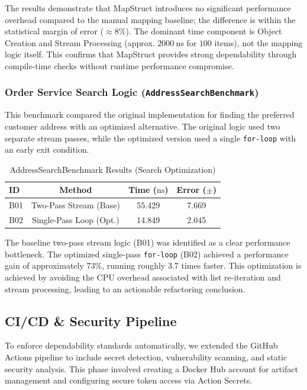 The results demonstrate that MapStruct introduces no significant performance overhead compared to the manual mapping baseline; the difference is within the statistical margin of error ($\approx 8\%$). The dominant time component is Object Creation and Stream Processing (approx. $2000~\text{ns}$ for $100$ items), not the mapping logic itself. This confirms that MapStruct provides strong dependability through compile-time checks without runtime performance compromise.

\subsubsection{Order Service Search Logic (\texttt{AddressSearchBenchmark})}
This benchmark compared the original implementation for finding the preferred customer address with an optimized alternative. The original logic used two separate stream passes, while the optimized version used a single \texttt{for-loop} with an early exit condition.

\begin{table}[h]
    \centering
    \begin{tabular}{l c c c}
        \toprule
        \textbf{ID} & \textbf{Method} & \textbf{Time ($\text{ns}$)} & \textbf{Error ($\pm$)} \\
        \midrule
        B01 & Two-Pass Stream (Base) & 55.429 & 7.669 \\
        B02 & Single-Pass Loop (Opt.) & 14.849 & 2.045 \\
        \bottomrule
    \end{tabular}
    \caption{AddressSearchBenchmark Results (Search Optimization)}
    \label{tab:search_benchmark}
\end{table}

The baseline two-pass stream logic (B01) was identified as a clear performance bottleneck. The optimized single-pass \texttt{for-loop} (B02) achieved a performance gain of approximately $73\%$, running roughly $3.7$ times faster. This optimization is achieved by avoiding the CPU overhead associated with list re-iteration and stream processing, leading to an actionable refactoring conclusion.

\subsection{CI/CD \& Security Pipeline}
To enforce dependability standards automatically, we extended the GitHub Actions pipeline to include secret detection, vulnerability scanning, and static security analysis. This phase involved creating a Docker Hub account for artifact management and configuring secure token access via Action Secrets.

